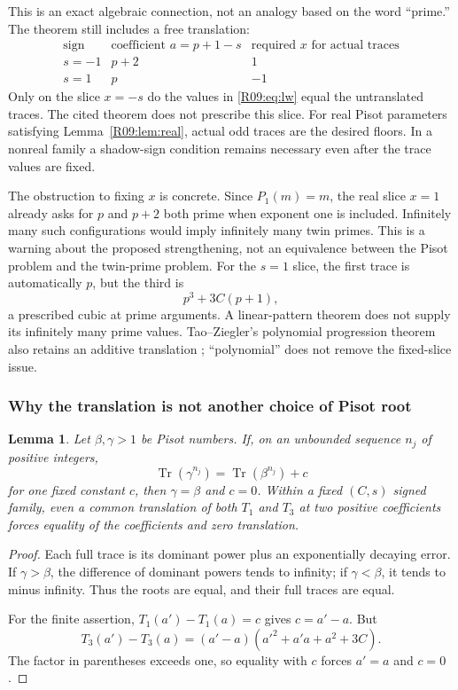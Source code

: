 \documentclass[11pt,a4paper]{article}
\newtheorem{lemma}[theorem]{Lemma}\newtheorem{proposition}[theorem]{Proposition}
\theoremstyle{definition}\newtheorem{definition}[theorem]{Definition}
\theoremstyle{remark}\newtheorem{remark}[theorem]{Remark}
\DeclareMathOperator{\Tr}{Tr}\DeclareMathOperator{\tr}{tr}\DeclareMathOperator{\Nm}{N}
\begin{document}
This is an exact algebraic connection, not an analogy based on the
word ``prime.'' The theorem still includes a free translation:
\[
\begin{array}{c|c|c}
\text{sign}&\text{coefficient }a=p+1-s&\text{required }x\text{ for actual traces}\\
\hline
s=-1 & p+2 & 1\\
s=1 & p & -1
\end{array}
\]
Only on the slice $x=-s$ do the values in \eqref{R09:eq:lw} equal the
untranslated traces. The cited theorem does not prescribe this slice.
For real Pisot parameters satisfying Lemma~\ref{R09:lem:real}, actual odd
traces are the desired floors. In a nonreal family a shadow-sign
condition remains necessary even after the trace values are fixed.

The obstruction to fixing $x$ is concrete. Since $P_1(m)=m$, the real
slice $x=1$ already asks for $p$ and $p+2$ both prime when exponent one
is included. Infinitely many such configurations would imply infinitely
many twin primes. This is a warning about the proposed strengthening,
not an equivalence between the Pisot problem and the twin-prime problem.
For the $s=1$ slice, the first trace is automatically $p$, but the third is
\[
 p^3+3C(p+1),
\]
a prescribed cubic at prime arguments. A linear-pattern theorem does
not supply its infinitely many prime values. Tao--Ziegler's polynomial
progression theorem also retains an additive translation
\cite{TZ2008}; ``polynomial'' does not remove the fixed-slice issue.

\subsubsection{Why the translation is not another choice of Pisot root}

\begin{lemma}\label{R09:lem:rigidity}
Let $\beta,\gamma>1$ be Pisot numbers. If, on an unbounded sequence
$n_j$ of positive integers,
\[
 \Tr(\gamma^{n_j})=\Tr(\beta^{n_j})+c
\]
for one fixed constant $c$, then $\gamma=\beta$ and $c=0$.
Within a fixed $(C,s)$ signed family, even a common translation of
both $T_1$ and $T_3$ at two positive coefficients forces equality of
the coefficients and zero translation.
\end{lemma}
\begin{proof}
Each full trace is its dominant power plus an exponentially decaying
error. If $\gamma>\beta$, the difference of dominant powers tends to
infinity; if $\gamma<\beta$, it tends to minus infinity. Thus the roots
are equal, and their full traces are equal.

For the finite assertion, $T_1(a')-T_1(a)=c$ gives $c=a'-a$. But
\[
 T_3(a')-T_3(a)
 =(a'-a)(a'^2+a'a+a^2+3C).
\]
The factor in parentheses exceeds one, so equality with $c$ forces
$a'=a$ and $c=0$.
\end{proof}
\end{document}
